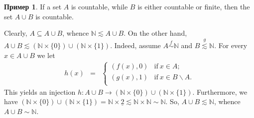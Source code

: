 \documentclass[12pt,notitlepage]{article}
\theoremstyle{plain}
\newtheorem{lemma}[thm]{Лемма}
\theoremstyle{definition}
\newtheorem{exm}[thm]{Пример}
\theoremstyle{plain}
\newcommand{\N}{\mathbb{N}}
\newcommand{\sbs}{\subseteq}
\renewcommand{\setminus}{\smallsetminus}
\renewcommand{\phi}{\varphi}
\newcommand{\ul}[1]{\underline{#1}}
\newcommand{\1}{\mathbf{1}}
\newcommand{\0}{\mathbf{0}}
\begin{document}
\begin{exm}\label{L10:2_union}
	If a set $A$ is countable, while $B$ is either countable or finite, then the set $A \cup B$ is countable.
	
	Clearly, $A \sbs A \cup B$, whence $\N \lesssim A \cup B$. On the other hand, $A \cup B \lesssim (\N \times \{ 0 \}) \cup (\N \times \{ 1 \})$. Indeed, assume $A \stackrel{f}{\sim} \N$ and $B \stackrel{g}{\lesssim} \N$. For every $x \in A \cup B$ we let
	$$
	\begin{array}{rcll}
		h(x) &=&\begin{cases}
			(f(x),0)& \mbox{if}\ x \in A;\\
			(g(x),1)& \mbox{if}\ x \in B \setminus A.\\
		\end{cases}
	\end{array}
	$$
	This yields an injection $h\colon A \cup B \to (\N \times \{ 0 \}) \cup (\N \times \{ 1 \})$. Furthermore, we have $(\N \times \{ 0 \}) \cup (\N \times \{ 1 \}) = \N \times \ul{2} \lesssim \N \times \N \sim \N$. So, $A \cup B \lesssim \N$, whence $A \cup B \sim \N$.
\end{exm}
%
%
%
\end{document}
